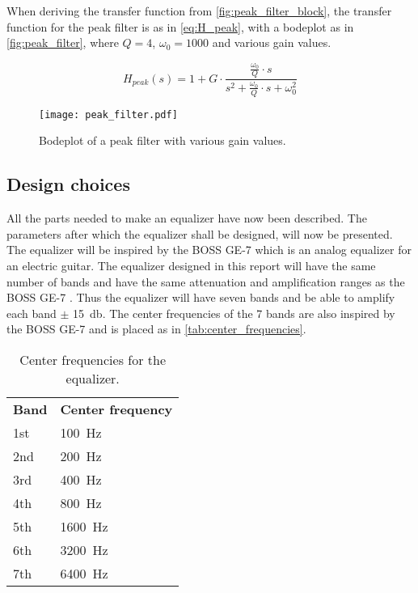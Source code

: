 When deriving the transfer function from \autoref{fig:peak_filter_block}, the transfer function for the peak filter is as in \autoref{eq:H_peak}, with a bodeplot as in \autoref{fig:peak_filter}, where $Q = 4$, $\omega_0 = 1000$ and various gain values. 

\begin{equation}\label{eq:H_peak}
        H_{peak}(s) = 1+G \cdot \frac{\frac{\omega_0}{Q}\cdot s}{s^2+\frac{\omega_0}{Q}\cdot s + \omega_0^2}
    \end{equation}
    
    \startexplain
    \stopexplain

\begin{figure}[!h]
    \centering
        \texttt{[image: peak\_filter.pdf]}
        \caption{Bodeplot of a peak filter with various gain values.}
        \label{fig:peak_filter}
  \end{figure} 
  
\subsection{Design choices}
All the parts needed to make an equalizer have now been described. The parameters after which the equalizer shall be designed, will now be presented. 
The equalizer will be inspired by the BOSS GE-7 which is an analog equalizer for an electric guitar. The equalizer designed in this report will have the same number of bands and have the same attenuation and amplification ranges as the BOSS GE-7 \citep{Boss_GE7}. Thus the equalizer will have seven bands and be able to amplify each band $\pm$ \SI{15}{\decibel}.
The center frequencies of the 7 bands are also inspired by the BOSS GE-7 and is placed as in \autoref{tab:center_frequencies}.

\begin{table}[htbp]
\centering
\caption{Center frequencies for the equalizer.}
\label{tab:center_frequencies}
\begin{tabular}{|l|l|}
\cline{1-2}
\textbf{Band} & \textbf{Center frequency} \\ \cline{1-2}
1st & \SI{100}{\hertz} \\  \cline{1-2}
2nd & \SI{200}{\hertz}\\ \cline{1-2}
3rd & \SI{400}{\hertz} \\ \cline{1-2}
4th & \SI{800}{\hertz} \\ \cline{1-2}
5th & \SI{1600}{\hertz} \\ \cline{1-2}
6th & \SI{3200}{\hertz} \\ \cline{1-2}
7th & \SI{6400}{\hertz} \\ \cline{1-2}
\end{tabular}
\end{table}


